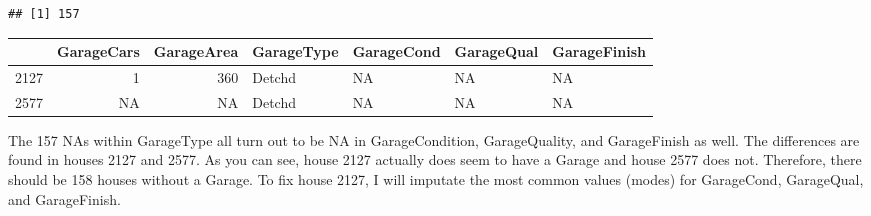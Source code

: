 \documentclass[]{article}
\newenvironment{Shaded}{\begin{snugshade}}{\end{snugshade}}
\newcommand{\KeywordTok}[1]{\textcolor[rgb]{0.13,0.29,0.53}{\textbf{#1}}}
\newcommand{\StringTok}[1]{\textcolor[rgb]{0.31,0.60,0.02}{#1}}
\newcommand{\CommentTok}[1]{\textcolor[rgb]{0.56,0.35,0.01}{\textit{#1}}}
\newcommand{\OperatorTok}[1]{\textcolor[rgb]{0.81,0.36,0.00}{\textbf{#1}}}
\newcommand{\NormalTok}[1]{#1}
\begin{document}
\begin{verbatim}
## [1] 157
\end{verbatim}

\begin{Shaded}
\end{Shaded}

\begin{longtable}[]{@{}lrrllll@{}}
\toprule
& GarageCars & GarageArea & GarageType & GarageCond & GarageQual &
GarageFinish\tabularnewline
\midrule
\endhead
2127 & 1 & 360 & Detchd & NA & NA & NA\tabularnewline
2577 & NA & NA & Detchd & NA & NA & NA\tabularnewline
\bottomrule
\end{longtable}

The 157 NAs within GarageType all turn out to be NA in GarageCondition,
GarageQuality, and GarageFinish as well. The differences are found in
houses 2127 and 2577. As you can see, house 2127 actually does seem to
have a Garage and house 2577 does not. Therefore, there should be 158
houses without a Garage. To fix house 2127, I will imputate the most
common values (modes) for GarageCond, GarageQual, and GarageFinish.
\end{document}
